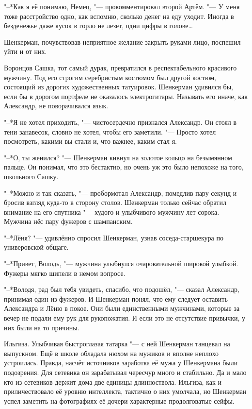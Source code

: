 "--*Как я её понимаю, Немец, "--- прокомментировал второй Артём.
"--- У меня тоже расстройство одно, как вспомню, сколько денег на еду уходит.
Иногда в безденежье даже кусок в горло не лезет, одни цифры в голове\dots{}

Шенкерман, почувствовав неприятное желание закрыть руками лицо, поспешил уйти и от них.

Воронцов Сашка, тот самый дурак, превратился в респектабельного красивого мужчину.
Под его строгим серебристым костюмом был другой костюм, состоящий из дорогих художественных татуировок.
Шенкерман удивился бы, если бы в дорогом портфеле не оказалось электрогитары.
Называть его иначе, как Александр, не поворачивался язык.

"--*Я не хотел приходить, "--- чистосердечно признался Александр.
Он стоял в тени занавесок, словно не хотел, чтобы его заметили.
"--- Просто хотел посмотреть, какими вы стали и, что важнее, каким стал я.

"--*О, ты женился? "--- Шенкерман кивнул на золотое кольцо на безымянном пальце.
Он понимал, что это бестактно, но очень уж это было непохоже на того, школьного Сашку.

"--*Можно и так сказать, "--- пробормотал Александр, помедлив пару секунд и бросив взгляд куда-то в сторону столов.
Шенкерман только сейчас обратил внимание на его спутника "--- худого и улыбчивого мужчину лет сорока.
Мужчина нёс пару фужеров с шампанским.

"--*Лёня? "--- удивлённо спросил Шенкерман, узнав соседа-старшекура по универовской общаге.

"--*Привет, Володь, "--- мужчина улыбнулся очаровательной широкой улыбкой.
Фужеры мягко шипели в немом вопросе.

"--*Володя, рад был тебя увидеть, спасибо, что подошёл, "--- сказал Александр, принимая один из фужеров.
И Шенкерман понял, что ему следует оставить Александра и Лёню в покое.
Они были единственными мужчинами, которые за вечер не подали ему рук для рукопожатия.
И если это не отсутствие привычки, у них были на то причины.

Ильгиза.
Улыбчивая быстроглазая татарка "--- с ней Шенкерман танцевал на выпускном.
Ещё в школе обладала нюхом на мужиков и вполне неплохо устроилась.
Правда, насчёт источников заработка её мужа у Шенкермана были подозрения.
Для сетевика он зарабатывал чересчур много и стабильно.
Да и мало кто из сетевиков держит дома две единицы длинноствола.
Ильгиза, как и приличествовало её уровню интеллекта, тактично о них умолчала, но Шенкерман успел заметить на фотографиях её дочери характерные продолговатые сейфы.

